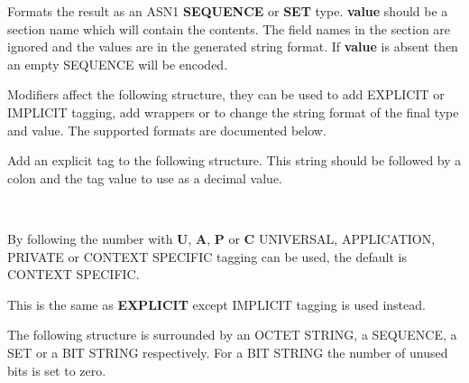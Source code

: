 \documentclass[]{article}
\let\realtextbf=\textbf
\renewcommand{\textbf}[1]{\textcolor{boldcolor}{\realtextbf{#1}}}
\begin{document}
\begin{description}
\itemsep1pt\parskip0pt
\item[\textbf{SEQUENCE}, \textbf{SEQ}, \textbf{SET}]
Formats the result as an ASN1 \textbf{SEQUENCE} or \textbf{SET} type.
\textbf{value} should be a section name which will contain the contents.
The field names in the section are ignored and the values are in the
generated string format. If \textbf{value} is absent then an empty
SEQUENCE will be encoded.
\end{description}


Modifiers affect the following structure, they can be used to add
EXPLICIT or IMPLICIT tagging, add wrappers or to change the string
format of the final type and value. The supported formats are documented
below.

\begin{description}
\itemsep1pt\parskip0pt
\item[\textbf{EXPLICIT}, \textbf{EXP}]
Add an explicit tag to the following structure. This string should be
followed by a colon and the tag value to use as a decimal value.

~

By following the number with \textbf{U}, \textbf{A}, \textbf{P} or
\textbf{C} UNIVERSAL, APPLICATION, PRIVATE or CONTEXT SPECIFIC tagging
can be used, the default is CONTEXT SPECIFIC.
\end{description}

\begin{description}
\itemsep1pt\parskip0pt
\item[\textbf{IMPLICIT}, \textbf{IMP}]
This is the same as \textbf{EXPLICIT} except IMPLICIT tagging is used
instead.
\end{description}

\begin{description}
\itemsep1pt\parskip0pt
\item[\textbf{OCTWRAP}, \textbf{SEQWRAP}, \textbf{SETWRAP},
\textbf{BITWRAP}]
The following structure is surrounded by an OCTET STRING, a SEQUENCE, a
SET or a BIT STRING respectively. For a BIT STRING the number of unused
bits is set to zero.
\end{description}
\end{document}
